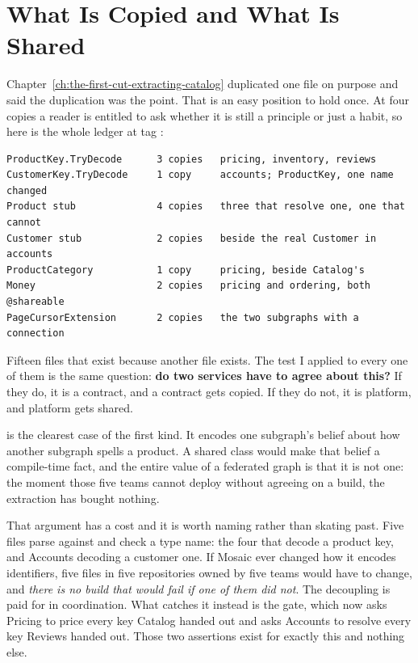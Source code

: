 \section{What Is Copied and What Is Shared}
\label{sec:ch12-copied-and-shared}
%

Chapter~\ref{ch:the-first-cut-extracting-catalog} duplicated one file on purpose
and said the duplication was the point. That is an easy position to hold once. At
four copies a reader is entitled to ask whether it is still a principle or just a
habit, so here is the whole ledger at tag :

\begin{verbatim}
ProductKey.TryDecode      3 copies   pricing, inventory, reviews
CustomerKey.TryDecode     1 copy     accounts; ProductKey, one name changed
Product stub              4 copies   three that resolve one, one that cannot
Customer stub             2 copies   beside the real Customer in accounts
ProductCategory           1 copy     pricing, beside Catalog's
Money                     2 copies   pricing and ordering, both @shareable
PageCursorExtension       2 copies   the two subgraphs with a connection
\end{verbatim}

Fifteen files that exist because another file exists. The test I applied to
every one of them is the same question: \textbf{do two services have to agree
about this?} If they do, it is a contract, and a contract gets copied. If they
do not, it is platform, and platform gets shared.

%
 is the clearest case of the first kind. It encodes
one subgraph's belief about how another subgraph spells a product. A shared
class would make that belief a compile-time fact, and the entire value of a
federated graph is that it is not one: the moment those five teams cannot deploy
without agreeing on a build, the extraction has bought nothing.

That argument has a cost and it is worth naming rather than skating past.
Five files parse against  and check a type name: the four
that decode a product key, and Accounts decoding a customer one. If Mosaic ever
changed how it encodes identifiers, five files in five repositories owned by
five teams would have to change, and \emph{there is no build that would fail if
one of them did not}. The decoupling is paid for in coordination. What
catches it instead is the gate, which now asks Pricing to price every key
Catalog handed out and asks Accounts to resolve every key Reviews handed out.
Those two assertions exist for exactly this and nothing else.

